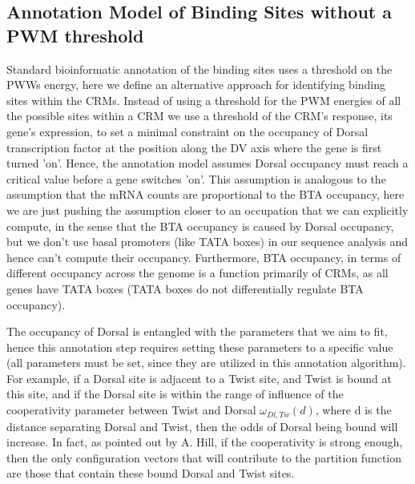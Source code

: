 \subsection{Annotation Model of Binding Sites without a PWM threshold}

Standard bioinformatic annotation of the binding sites uses a threshold on the PWWs energy, here we define an alternative approach for identifying binding sites within the CRMs.  Instead of using a threshold for the PWM energies of all the possible sites within a CRM we use a threshold of the CRM's response, its gene's expression, to set a minimal constraint on the occupancy of Dorsal transcription factor at the position along the DV axis where the gene is first turned 'on'.  Hence, the annotation model assumes Dorsal occupancy must reach a critical value before a gene switches 'on'.  This assumption is analogous to the assumption that the mRNA counts are proportional to the BTA occupancy, here we are just pushing the assumption closer to an occupation that we can explicitly compute, in the sense that the BTA occupancy is caused by Dorsal occupancy, but we don't use basal promoters (like TATA boxes) in our sequence analysis and hence can't compute their occupancy.  Furthermore, BTA occupancy, in terms of different occupancy across the genome is a function primarily of CRMs, as all genes have TATA boxes (TATA boxes do not differentially regulate BTA occupancy).  

The occupancy of Dorsal is entangled with the parameters that we aim to fit, hence this annotation step requires setting these parameters to a specific value (all parameters must be set, since they are utilized in this annotation algorithm).  For example, if a Dorsal site is adjacent to a Twist site, and Twist is bound at this site, and if the Dorsal site is within the range of influence of the cooperativity parameter between Twist and Dorsal $\omega_{Dl,Tw}(d)$, where d is the distance separating Dorsal and Twist, then the odds of Dorsal being bound will increase.  In fact, as pointed out by A. Hill, if the cooperativity is strong enough, then the only configuration vectors that will contribute to the partition function are those that contain these bound Dorsal and Twist sites.  
%

